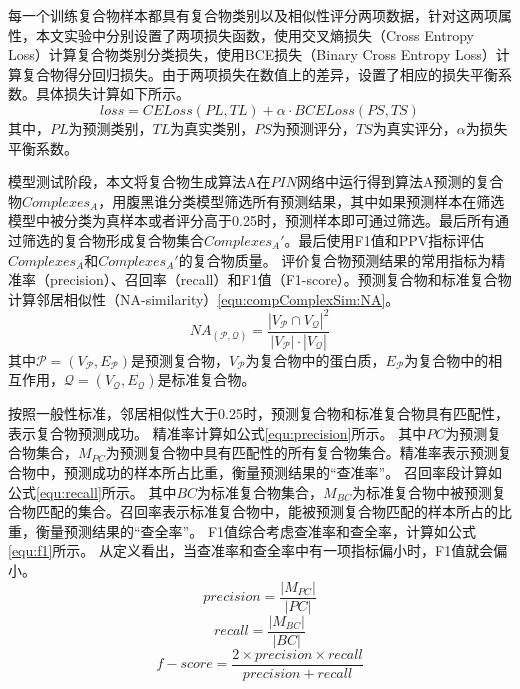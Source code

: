 每一个训练复合物样本都具有复合物类别以及相似性评分两项数据，针对这两项属性，本文实验中分别设置了两项损失函数，使用交叉熵损失（Cross Entropy Loss）计算复合物类别分类损失，使用BCE损失（Binary Cross Entropy Loss）计算复合物得分回归损失。由于两项损失在数值上的差异，设置了相应的损失平衡系数。具体损失计算如下所示。
\begin{equation}
    \label{equ:loss}
    loss=CELoss(PL,TL)+\alpha \cdot BCELoss(PS,TS)
\end{equation}
其中，$PL$为预测类别，$TL$为真实类别，$PS$为预测评分，$TS$为真实评分，$\alpha$为损失平衡系数。

模型测试阶段，本文将复合物生成算法A在$PIN$网络中运行得到算法A预测的复合物$Complexes_A$，用腹黑谁分类模型筛选所有预测结果，其中如果预测样本在筛选模型中被分类为真样本或者评分高于0.25时，预测样本即可通过筛选。最后所有通过筛选的复合物形成复合物集合$Complexes_A'$。最后使用F1值和PPV指标评估$Complexes_A$和$Complexes_A'$的复合物质量。
评价复合物预测结果的常用指标为精准率（precision）、召回率（recall）和F1值（F1-score）。预测复合物和标准复合物计算邻居相似性（NA-similarity）\ref{equ:compComplexSim:NA}。
\begin{equation}
    \label{equ:compComplexSim:NA}
    NA_{(\mathcal{P} ,\mathcal{Q} )} = \frac{{\left\lvert V_{\mathcal{P}} \cap V_{\mathcal{Q}}\right\rvert}^2 }{{\left\lvert V_{\mathcal{P}} \right\rvert}\cdot  {\left\lvert V_{\mathcal{Q}} \right\rvert}}
\end{equation}
其中$\mathcal{P}=(V_{\mathcal{P}} ,E_{\mathcal{P}})$是预测复合物，$V_{\mathcal{P}}$为复合物中的蛋白质，$E_{\mathcal{P}}$为复合物中的相互作用，$\mathcal{Q}=(V_{\mathcal{Q}} ,E_{\mathcal{Q}})$是标准复合物。

按照一般性标准，邻居相似性大于0.25时，预测复合物和标准复合物具有匹配性，表示复合物预测成功。
精准率计算如公式\ref{equ:precision}所示。
其中$PC$为预测复合物集合，$M_{PC}$为预测复合物中具有匹配性的所有复合物集合。精准率表示预测复合物中，预测成功的样本所占比重，衡量预测结果的“查准率”。
召回率段计算如公式\ref{equ:recall}所示。
其中$BC$为标准复合物集合，$M_{BC}$为标准复合物中被预测复合物匹配的集合。召回率表示标准复合物中，能被预测复合物匹配的样本所占的比重，衡量预测结果的“查全率”。
F1值综合考虑查准率和查全率，计算如公式\ref{equ:f1}所示。
从定义看出，当查准率和查全率中有一项指标偏小时，F1值就会偏小。
\begin{equation}
    \label{equ:precision}
    precision=\frac{\left\lvert M_{PC}\right\rvert }{\left\lvert PC\right\rvert }
\end{equation}
\begin{equation}
    \label{equ:recall}
    recall=\frac{\left\lvert M_{BC}\right\rvert }{\left\lvert BC\right\rvert }
\end{equation}
\begin{equation}
    \label{equ:f1}
    f-score=\frac{2\times precision\times recall}{precision + recall }
\end{equation}

